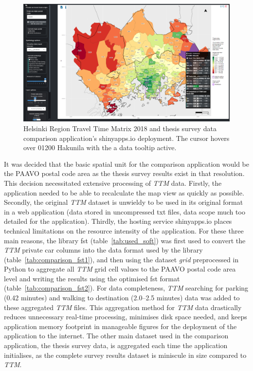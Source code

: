 \begin{figure}[H]%
    \includegraphics[width=\textwidth]{images/shinyapps_comparison.png}
    \caption[Comparison application screenshot]{Helsinki Region Travel Time Matrix 2018 and thesis survey data comparison application's shinyapps.io deployment. The cursor hovers over 01200 Hakunila with the a data tooltip active.}%
    \label{fig:shinyapps_comparison}%
\end{figure}

It was decided that the basic spatial unit for the comparison application would be the PAAVO postal code area as the thesis survey results exist in that resolution. This decision necessitated extensive processing of \textit{TTM} data. Firstly, the application needed to be able to recalculate the map view as quickly as possible. Secondly, the original \textit{TTM} dataset is unwieldy to be used in its original format in a web application (data stored in uncompressed txt files, data scope much too detailed for the application). Thirdly, the hosting service shinyapps.io places technical limitations on the resource intensity of the application. For these three main reasons, the library fst (table~\ref{tab:used_soft}) was first used to convert the \textit{TTM} private car columns into the data format used by the library (table~\ref{tab:comparison_fst1}), and then using the dataset \textit{grid} preprocessed in Python to aggregate all \textit{TTM} grid cell values to the PAAVO postal code area level and writing the results using the optimised fst format (table~\ref{tab:comparison_fst2}). For data completeness, \textit{TTM} searching for parking (0.42 minutes) and walking to destination (2.0--2.5 minutes) data was added to these aggregated \textit{TTM} files. This aggregation method for \textit{TTM} data drastically reduces unnecessary real-time processing, minimises disk space needed, and keeps application memory footprint in manageable figures for the deployment of the application to the internet. The other main dataset used in the comparison application, the thesis survey data, is aggregated each time the application initialises, as the complete survey results dataset is miniscule in size compared to \textit{TTM}.

